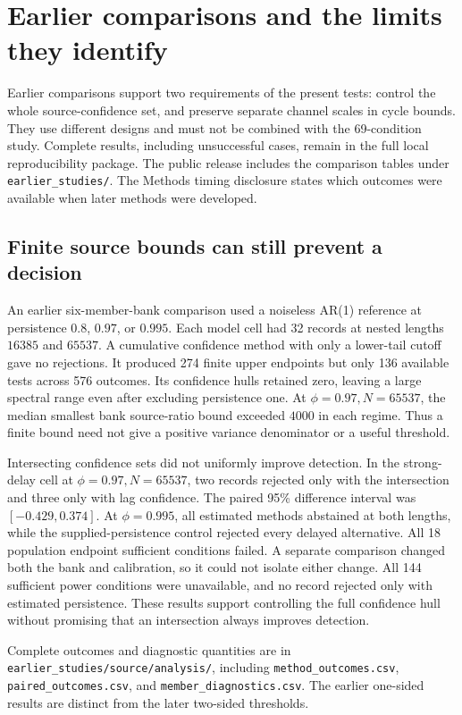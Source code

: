 \section{Earlier comparisons and the limits they identify}\label{study16:onesided}
Earlier comparisons support two requirements of the present tests: control the whole source-confidence set, and preserve separate channel scales in cycle bounds. They use different designs and must not be combined with the 69-condition study. Complete results, including unsuccessful cases, remain in the full local reproducibility package. The public release includes the comparison tables under \texttt{earlier\_studies/}. The Methods timing disclosure states which outcomes were available when later methods were developed.

\subsection{Finite source bounds can still prevent a decision}
An earlier six-member-bank comparison used a noiseless AR(1) reference at persistence $0.8$, $0.97$, or $0.995$. Each model cell had 32 records at nested lengths $16385$ and $65537$. A cumulative confidence method with only a lower-tail cutoff gave no rejections. It produced 274 finite upper endpoints but only 136 available tests across 576 outcomes. Its confidence hulls retained zero, leaving a large spectral range even after excluding persistence one. At $\phi=0.97,N=65537$, the median smallest bank source-ratio bound exceeded $4000$ in each regime. Thus a finite bound need not give a positive variance denominator or a useful threshold.

Intersecting confidence sets did not uniformly improve detection. In the strong-delay cell at $\phi=0.97,N=65537$, two records rejected only with the intersection and three only with lag confidence. The paired 95\% difference interval was $[-0.429,0.374]$. At $\phi=0.995$, all estimated methods abstained at both lengths, while the supplied-persistence control rejected every delayed alternative. All 18 population endpoint sufficient conditions failed. A separate comparison changed both the bank and calibration, so it could not isolate either change. All 144 sufficient power conditions were unavailable, and no record rejected only with estimated persistence. These results support controlling the full confidence hull without promising that an intersection always improves detection.

Complete outcomes and diagnostic quantities are in \texttt{earlier\_studies/source/analysis/}, including \texttt{method\_outcomes.csv}, \texttt{paired\_outcomes.csv}, and \texttt{member\_diagnostics.csv}. The earlier one-sided results are distinct from the later two-sided thresholds.

